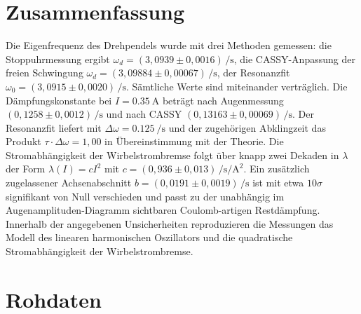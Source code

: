 \documentclass[11pt,a4paper]{article}
\begin{document}
\section{Zusammenfassung}
Die Eigenfrequenz des Drehpendels wurde mit drei Methoden
gemessen: die Stoppuhrmessung ergibt
$\omega_d=(3{,}0939\pm 0{,}0016)\,\si{\per\second}$, die
CASSY-Anpassung der freien Schwingung
$\omega_d=(3{,}09884\pm 0{,}00067)\,\si{\per\second}$, der
Resonanzfit $\omega_0=(3{,}0915\pm 0{,}0020)\,\si{\per\second}$.
Sämtliche Werte sind miteinander verträglich. Die
Dämpfungskonstante bei $I=\SI{0,35}{\ampere}$ beträgt nach
Augenmessung $(0{,}1258\pm 0{,}0012)\,\si{\per\second}$ und nach
CASSY $(0{,}13163\pm 0{,}00069)\,\si{\per\second}$. Der
Resonanzfit liefert mit $\Delta\omega = \SI{0,125}{\per\second}$
und der zugehörigen Abklingzeit das Produkt
$\tau\cdot\Delta\omega=1{,}00$ in Übereinstimmung mit der Theorie.
Die Stromabhängigkeit der Wirbelstrombremse folgt über knapp zwei
Dekaden in $\lambda$ der Form $\lambda(I)=cI^2$ mit
$c=(0{,}936\pm 0{,}013)\,\si{\per\second\per\square\ampere}$. Ein
zusätzlich zugelassener Achsenabschnitt
$b=(0{,}0191\pm 0{,}0019)\,\si{\per\second}$ ist mit etwa
$10\sigma$ signifikant von Null verschieden und passt zu der
unabhängig im Augenamplituden-Diagramm sichtbaren Coulomb-artigen
Restdämpfung. Innerhalb der angegebenen Unsicherheiten
reproduzieren die Messungen das Modell des linearen harmonischen
Oszillators und die quadratische Stromabhängigkeit der
Wirbelstrombremse.

\appendix
\section{Rohdaten}

\begin{table}[H]
\centering
\begin{minipage}{0.45\linewidth}
\centering
\caption{Stoppuhrmessung (Aufgabe~1): fünfmal die Zeit für zehn
Schwingungen bei \SI{0,35}{\ampere}.}
\label{tab:t10_anh}

\end{minipage}\hfill
\begin{minipage}{0.50\linewidth}
\centering
\caption{Augen-Amplitudenmessung (Aufgabe~2) in zwei Durchgängen,
$u(A)=\SI{0,1}{\centi\metre}$.}
\label{tab:amplituden_anh}

\end{minipage}
\end{table}
\end{document}

